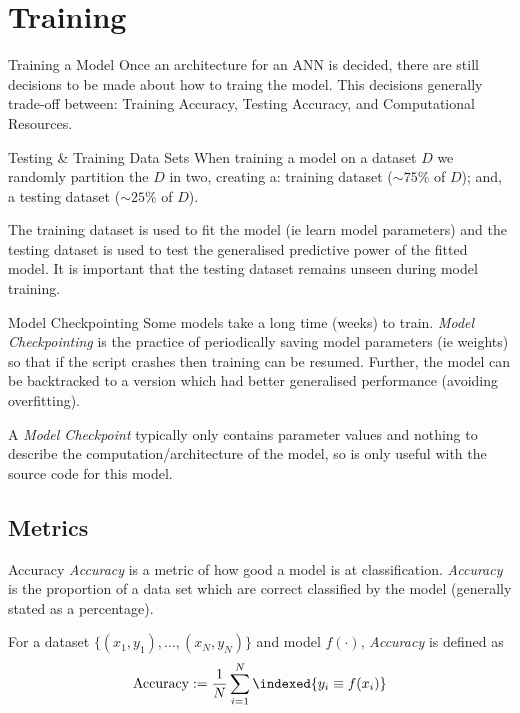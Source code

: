 \documentclass[11pt,a4paper]{article}
\begin{document}
\section{Training}

  \begin{remark}{Training a Model}
    Once an architecture for an ANN is decided, there are still decisions to be made about how to traing the model. This decisions generally trade-off between: Training Accuracy, Testing Accuracy, and Computational Resources.
  \end{remark}

  \begin{proposition}{Testing \& Training Data Sets}
    When training a model on a dataset $D$ we randomly partition the $D$ in two, creating a: training dataset ($\sim75\%$ of $D$); and, a testing dataset ($\sim25\%$ of $D$).
    \par The training dataset is used to fit the model (ie learn model parameters) and the testing dataset is used to test the generalised predictive power of the fitted model. It is important that the testing dataset remains unseen during model training.
  \end{proposition}

  \begin{definition}{Model Checkpointing}
    Some models take a long time (weeks) to train. \textit{Model Checkpointing} is the practice of periodically saving model parameters (ie weights) so that if the script crashes then training can be resumed. Further, the model can be backtracked to a version which had better generalised performance (avoiding overfitting).
    \par A \textit{Model Checkpoint} typically only contains parameter values and nothing to describe the computation/architecture of the model, so is only useful with the source code for this model.
  \end{definition}

\subsection{Metrics}

  \begin{definition}{Accuracy}
    \textit{Accuracy} is a metric of how good a model is at classification. \textit{Accuracy} is the proportion of a data set which are correct classified by the model (generally stated as a percentage).
    \par For a dataset $\{(x_1,y_1),\dots,(x_N,y_N)\}$ and model $f(\cdot)$, \textit{Accuracy} is defined as
    \[ \text{Accuracy}:=\frac1N\sum_{i=1}^N\indexed\{y_i\equiv f(x_i)\} \]
  \end{definition}
\end{document}

